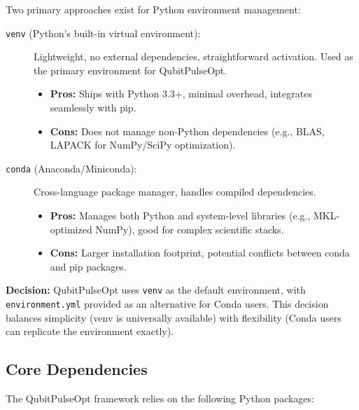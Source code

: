 \documentclass[11pt,a4paper]{article}
\theoremstyle{definition}
\theoremstyle{remark}
\begin{document}
Two primary approaches exist for Python environment management:

\begin{description}
    \item[\texttt{venv} (Python's built-in virtual environment):] Lightweight, no external dependencies, straightforward activation. Used as the primary environment for QubitPulseOpt.
    \begin{itemize}
        \item \textbf{Pros:} Ships with Python 3.3+, minimal overhead, integrates seamlessly with pip.
        \item \textbf{Cons:} Does not manage non-Python dependencies (e.g., BLAS, LAPACK for NumPy/SciPy optimization).
    \end{itemize}

    \item[\texttt{conda} (Anaconda/Miniconda):] Cross-language package manager, handles compiled dependencies.
    \begin{itemize}
        \item \textbf{Pros:} Manages both Python and system-level libraries (e.g., MKL-optimized NumPy), good for complex scientific stacks.
        \item \textbf{Cons:} Larger installation footprint, potential conflicts between conda and pip packages.
    \end{itemize}
\end{description}

\textbf{Decision:} QubitPulseOpt uses \texttt{venv} as the default environment, with \texttt{environment.yml} provided as an alternative for Conda users. This decision balances simplicity (venv is universally available) with flexibility (Conda users can replicate the environment exactly).

\subsection{Core Dependencies}

The QubitPulseOpt framework relies on the following Python packages:
\end{document}
